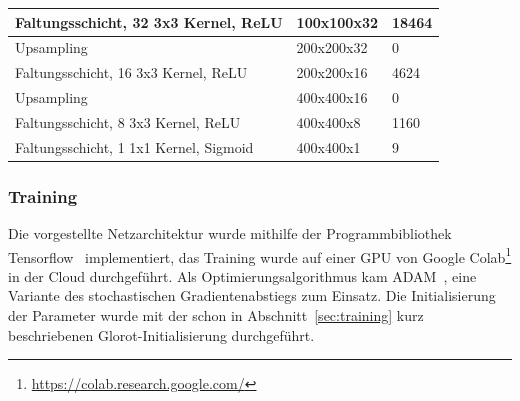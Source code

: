 \begin{table}
\begin{tabular}{|l|l|l|}
        \hline

        Faltungsschicht, 32 3x3 Kernel, ReLU   & 100x100x32                  & 18464                     \\

        \hline

        Upsampling                             & 200x200x32                  & 0                         \\

        \hline

        Faltungsschicht, 16 3x3 Kernel, ReLU   & 200x200x16                  & 4624                      \\

        \hline

        Upsampling                             & 400x400x16                  & 0                         \\

        \hline

        Faltungsschicht, 8 3x3 Kernel, ReLU    & 400x400x8                   & 1160                      \\

        \hline

        Faltungsschicht, 1 1x1 Kernel, Sigmoid & 400x400x1                   & 9                         \\

        \hline
    \end{tabular}
\end{table}

\subsubsection{Training}

Die vorgestellte Netzarchitektur wurde mithilfe der
Programmbibliothek Tensorflow~\cite{tensorflow2015-whitepaper}
implementiert,
das Training wurde auf einer GPU von Google
Colab\footnote{\url{https://colab.research.google.com/}} in der Cloud
durchgef\"uhrt.
Als Optimierungsalgorithmus kam ADAM~\cite{adam},
eine Variante des stochastischen Gradientenabstiegs zum Einsatz.
Die Initialisierung der Parameter wurde mit der schon in
Abschnitt~\ref{sec:training} kurz beschriebenen Glorot-Initialisierung
durchgef\"uhrt.

